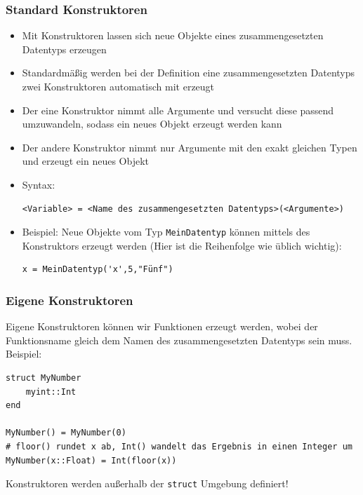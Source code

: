 \begin{frame}[fragile]
\frametitle{Standard Konstruktoren}
\begin{itemize}[<+->]
\item Mit Konstruktoren lassen sich neue Objekte eines zusammengesetzten Datentyps erzeugen
\item Standardmäßig werden bei der Definition eine zusammengesetzten Datentyps zwei Konstruktoren automatisch mit erzeugt
\item Der eine Konstruktor nimmt alle Argumente und versucht diese passend umzuwandeln, sodass ein neues Objekt erzeugt werden kann
\item Der andere Konstruktor nimmt nur Argumente mit den exakt gleichen Typen und erzeugt ein neues Objekt
\item Syntax:
\begin{verbatim}
<Variable> = <Name des zusammengesetzten Datentyps>(<Argumente>)
\end{verbatim}
\item Beispiel: Neue Objekte vom Typ \verb+MeinDatentyp+ können mittels des Konstruktors erzeugt werden (Hier ist die Reihenfolge wie üblich wichtig):
\begin{verbatim}
x = MeinDatentyp('x',5,"Fünf")
\end{verbatim}
\end{itemize}
\end{frame}
\begin{frame}[fragile]
\frametitle{Eigene Konstruktoren}
Eigene Konstruktoren können wir Funktionen erzeugt werden, wobei der Funktionsname gleich dem Namen des zusammengesetzten Datentyps sein muss.\\
Beispiel:
\begin{verbatim}
struct MyNumber
    myint::Int
end

MyNumber() = MyNumber(0)
# floor() rundet x ab, Int() wandelt das Ergebnis in einen Integer um
MyNumber(x::Float) = Int(floor(x))
\end{verbatim}
Konstruktoren werden außerhalb der \verb+struct+ Umgebung definiert!
\end{frame}
